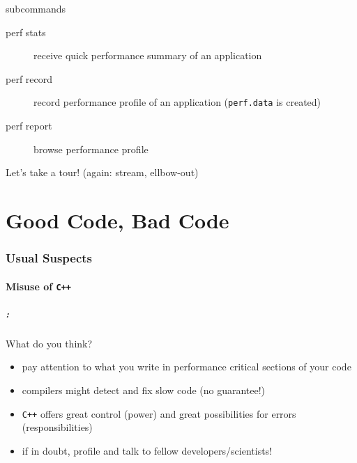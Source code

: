 \documentclass[9pt,xcolor=table]{beamer}
\def\cpp{\texttt{C++}}
\begin{document}
\begin{frame}
\begin{columns}[t]
\begin{column}{.3\textwidth}
    \end{column}
  \end{columns}
  \pause
  \begin{block}{subcommands}
    \begin{description}
    \item[perf stats] receive quick performance summary of an application
    \item[perf record] record performance profile of an application (\texttt{perf.data} is created)
    \item[perf report] browse performance profile  
      \end{description}
    \pause
    \begin{center}
      \alert{Let's take a tour!} (again: stream, ellbow-out)
    \end{center}
  \end{block}

\end{frame}


\part{Good Code, Bad Code}
\frame{\partpage}

\section{Usual Suspects}
\subsection{Misuse of \cpp{}}

\begin{frame}%
  \frametitle{\insertsectionhead{}: \insertsubsectionhead{}}
  \vfill
  \begin{center}
    \huge
    \alert{What do you think?}
  \end{center}
  \pause
  \vfill
  \begin{itemize}
  \item pay attention to what you write in performance critical sections of your code
  \item compilers might detect and fix slow code (no guarantee!)
  \item \cpp{} offers great control (power) and great possibilities for errors (responsibilities)
  \item if in doubt, \alert{profile} and talk to fellow developers/scientists!
  \end{itemize}
  \pause
\end{frame}
\end{document}
